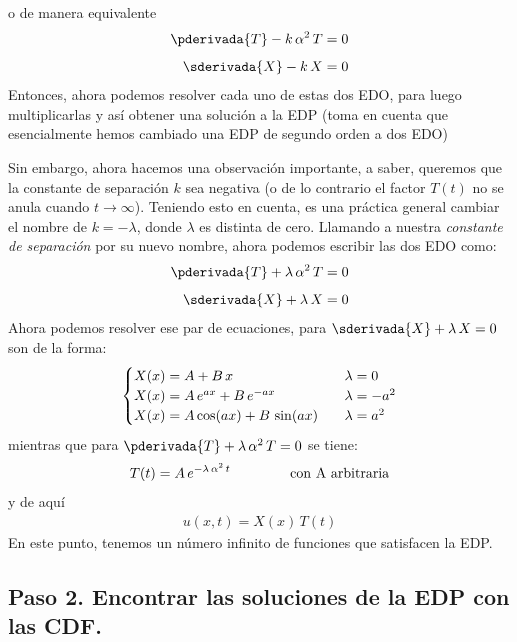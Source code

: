 o de manera equivalente
\begin{align*}
\pderivada{T} - k \, \alpha^{2} \, T &= 0 \\[0.5em]
\sderivada{X} - k \, X &= 0
\end{align*}
Entonces, ahora podemos resolver cada uno de estas dos EDO, para luego multiplicarlas y así obtener una solución a la EDP (toma en cuenta que esencialmente hemos cambiado una EDP de segundo orden a dos EDO)
\par
Sin embargo, ahora hacemos una observación importante, a saber, queremos que la constante de separación $k$ sea negativa (o de lo contrario el factor $T (t)$ no se anula cuando $t \to \infty$). Teniendo esto en cuenta, es una práctica general cambiar el nombre de $k = - \lambda$, donde $\lambda$ es distinta de cero. Llamando a nuestra \emph{constante de separación} por su nuevo nombre, ahora podemos escribir las dos EDO como:
\begin{align*}
\pderivada{T} + \lambda \, \alpha^{2} \, T &= 0 \\[0.5em]
\sderivada{X} + \lambda \, X &= 0
\end{align*}
Ahora podemos resolver ese par de ecuaciones, para $\sderivada{X} + \lambda \, X = 0$ son de la forma:
\begin{align}
\begin{cases}
X (x) = A + B \, x & \hspace{0.2cm} \lambda = 0 \\
X (x) = A \, e^{a x} + B \, e^{-a x} & \hspace{0.2cm} \lambda = - a^{2} \\
X (x) = A \cos (a x ) + B \, \sin (a x) & \hspace{0.2cm} \lambda = a^{2}
\end{cases}
\label{eq:ecuacion_06_02_31}
\end{align}
mientras que para $\pderivada{T} + \lambda \, \alpha^{2} \, T = 0$ se tiene:
\begin{align}
T (t) = A \, e^{- \lambda \, \alpha^{2} \, t} \hspace{1.5cm} \text{con A arbitraria}
\label{eq:ecuacion_06_02_36a}    
\end{align}
y de aquí
\begin{align*}
u (x, t) = X (x) \, T (t) 
\end{align*}
En este punto, tenemos un número infinito de funciones que satisfacen la EDP.

\newpage

\subsection{Paso 2. Encontrar las soluciones de la EDP con las CDF.}

